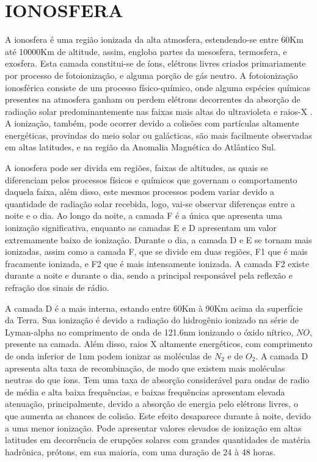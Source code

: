 \chapter{IONOSFERA}

A ionosfera é uma região ionizada da alta atmosfera, estendendo-se entre 60Km até 10000Km de altitude, assim, engloba partes da mesosfera, termosfera, e exosfera. Esta camada constitui-se de íons, elétrons livres criados primariamente por processo de fotoionização, e alguma porção de gás neutro. A fotoionização ionosférica consiste de um processo físico-químico, onde alguma espécies químicas presentes na atmosfera ganham ou perdem elétrons decorrentes da absorção de radiação solar predominantemente nas faixas mais altas do ultravioleta e raios-X \cite{RISNBETH:1969, NEGRETI:2012}. A ionização, também, pode ocorrer devido a colisões com partículas altamente energéticas, provindas do meio solar ou galácticas, são mais facilmente observadas em altas latitudes, e na região da Anomalia Magnética do Atlântico Sul.

A ionosfera pode ser divida em regiões, faixas de altitudes, as quais se diferenciam pelos processos físicos e químicos que governam o comportamento daquela faixa, além disso, este mesmos processos podem variar devido a quantidade de radiação solar recebida, logo, vai-se observar diferenças entre a noite e o dia. Ao longo da noite, a camada F é a única que apresenta uma ionização significativa, enquanto as camadas E e D apresentam um valor extremamente baixo de ionização. Durante o dia, a camada D e E se tornam mais ionizadas, assim como a camada F, que se divide em duas regiões, F1 que é mais fracamente ionizada, e F2 que é mais intensamente ionizada. A camada F2 existe durante a noite e durante o dia, sendo a principal responsável pela reflexão e refração dos sinais de rádio.

A camada D é a mais interna, estando entre 60Km à 90Km acima da superfície da Terra. Sua ionização é devido a radiação do hidrogênio ionizado na série de Lyman-alpha no comprimento de onda de 121.6nm ionizando o óxido nítrico, $NO$, presente na camada. Além disso, raios X altamente energéticos, com comprimento de onda inferior de 1nm podem ionizar as moléculas de $N_2$ e de $O_2$. A camada D apresenta alta taxa de recombinação, de modo que existem mais moléculas neutras do que íons. Tem uma taxa de absorção considerável para ondas de radio de média e alta baixa frequências, e baixas frequências apresentam elevada atenuação, principalmente, devido a absorção de energia pelo elétrons livres, o que aumenta as chances de colisão. Este efeito desaparece durante à noite, devido a uma menor ionização. Pode apresentar valores elevados de ionização em altas latitudes em decorrência de erupções solares com grandes quantidades de matéria hadrônica, prótons, em sua maioria, com uma duração de 24 à 48 horas.

